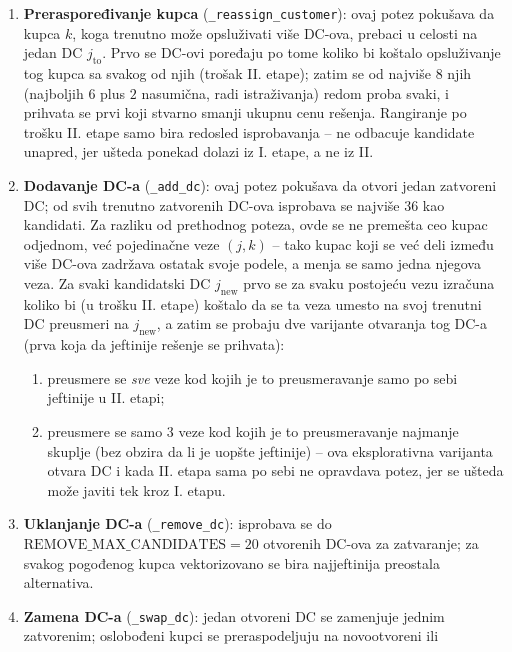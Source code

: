 \documentclass[12pt,a4paper]{article}
\begin{document}
\begin{enumerate}
  \item \textbf{Preraspoređivanje kupca} (\texttt{\_reassign\_customer}): ovaj
    potez pokušava da kupca $k$, koga trenutno može opsluživati više DC-ova,
    prebaci u celosti na jedan DC $j_{\text{to}}$. Prvo se DC-ovi poređaju po
    tome koliko bi koštalo opsluživanje tog kupca sa svakog od njih (trošak
    II. etape); zatim se od najviše $8$ njih (najboljih $6$ plus $2$
    nasumična, radi istraživanja) redom proba svaki, i prihvata se prvi koji
    stvarno smanji ukupnu cenu rešenja. Rangiranje po trošku II. etape samo
    bira redosled isprobavanja -- ne odbacuje kandidate unapred, jer ušteda
    ponekad dolazi iz I. etape, a ne iz II.
  \item \textbf{Dodavanje DC-a} (\texttt{\_add\_dc}): ovaj potez pokušava da
    otvori jedan zatvoreni DC; od svih trenutno zatvorenih DC-ova isprobava se
    najviše $36$ kao kandidati. Za razliku od prethodnog poteza, ovde se ne
    premešta ceo kupac odjednom, već pojedinačne veze $(j,k)$ -- tako kupac
    koji se već deli između više DC-ova zadržava ostatak svoje podele, a menja
    se samo jedna njegova veza. Za svaki kandidatski DC $j_{\text{new}}$ prvo
    se za svaku postojeću vezu izračuna koliko bi (u trošku II. etape) koštalo
    da se ta veza umesto na svoj trenutni DC preusmeri na $j_{\text{new}}$, a
    zatim se probaju dve varijante otvaranja tog DC-a (prva koja da jeftinije
    rešenje se prihvata):
    \begin{enumerate}
      \item[(i)] preusmere se \emph{sve} veze kod kojih je to preusmeravanje
        samo po sebi jeftinije u II. etapi;
      \item[(ii)] preusmere se samo $3$ veze kod kojih je to preusmeravanje
        najmanje skuplje (bez obzira da li je uopšte jeftinije) -- ova
        eksplorativna varijanta otvara DC i kada II. etapa sama po sebi ne
        opravdava potez, jer se ušteda može javiti tek kroz I. etapu.
    \end{enumerate}
  \item \textbf{Uklanjanje DC-a} (\texttt{\_remove\_dc}): isprobava se do
    $\text{REMOVE\_MAX\_CANDIDATES} = 20$ otvorenih DC-ova za zatvaranje; za
    svakog pogođenog kupca vektorizovano se bira najjeftinija preostala
    alternativa.
  \item \textbf{Zamena DC-a} (\texttt{\_swap\_dc}): jedan otvoreni DC se zamenjuje
    jednim zatvorenim; oslobođeni kupci se preraspodeljuju na novootvoreni ili

\end{enumerate}
\end{document}
